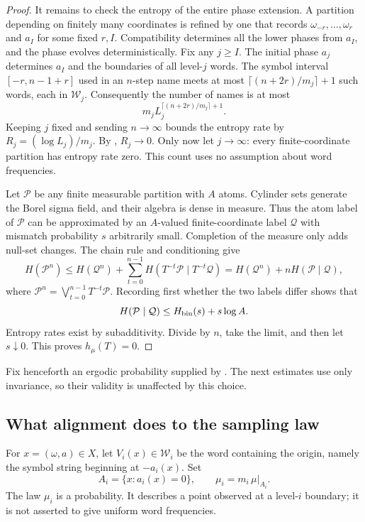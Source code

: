\begin{proof}
It remains to check the entropy of the entire phase extension.
A partition depending on finitely many coordinates is refined by
one that records $\omega_{-r},\ldots,\omega_r$ and $a_I$ for
some fixed $r,I$. Compatibility determines all the lower phases
from $a_I$, and the phase evolves deterministically. Fix any $j\ge I$.
The initial phase $a_j$ determines $a_I$ and the boundaries of all
level-$j$ words. The symbol interval $[-r,n-1+r]$ used in an $n$-step
name meets at most $\lceil(n+2r)/m_j\rceil+1$ such words, each in
$\mathcal W_j$. Consequently the number of names is at most
\[
 m_j L_j^{\lceil(n+2r)/m_j\rceil+1}.
\]
Keeping $j$ fixed and sending $n\to\infty$ bounds the entropy rate
by $R_j=(\log L_j)/m_j$. By , $R_j\to0$.
Only now let $j\to\infty$: every finite-coordinate partition has
entropy rate zero. This count uses no assumption about word frequencies.

Let $\mathcal P$ be any finite measurable partition with $A$ atoms.
Cylinder sets generate the Borel sigma field, and their algebra is
dense in measure. Thus the atom label of $\mathcal P$ can be
approximated by an $A$-valued finite-coordinate label
$\mathcal Q$ with mismatch probability $s$ arbitrarily small.
Completion of the measure only adds null-set changes.
The chain rule and conditioning give
\[
 H(\mathcal P^n)
 \le H(\mathcal Q^n)
     +\sum_{t=0}^{n-1}H(T^{-t}\mathcal P\mid T^{-t}\mathcal Q)
 =H(\mathcal Q^n)+nH(\mathcal P\mid\mathcal Q),
\]
where $\mathcal P^n=\bigvee_{t=0}^{n-1}T^{-t}\mathcal P$.
Recording first whether the two labels differ shows that
\[
 H(\mathcal P\mid\mathcal Q)\le H_{\rm bin}(s)+s\log A.
\]
Entropy rates exist by subadditivity. Divide by $n$, take the limit,
and then let $s\downarrow0$. This proves $h_\mu(T)=0$.
\end{proof}

Fix henceforth an ergodic probability supplied by
. The next estimates use only invariance, so their
validity is unaffected by this choice.

\subsection{What alignment does to the sampling law}

For $x=(\omega,a)\in X$, let $V_i(x)\in\mathcal W_i$ be the word
containing the origin, namely the symbol string beginning at
$-a_i(x)$. Set
\[
 A_i=\{x:a_i(x)=0\},\qquad
 \mu_i=m_i\,\mu|_{A_i}.
\]
The law $\mu_i$ is a probability. It describes a point observed at a
level-$i$ boundary; it is not asserted to give uniform word
frequencies.

